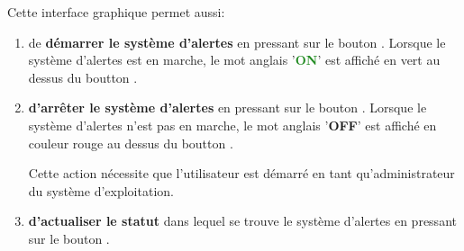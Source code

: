 Cette interface graphique permet aussi:
\begin{enumerate}[1)]
	\item de \textbf{d\'emarrer le syst\`eme d'alertes} en pressant
		sur le bouton . Lorsque le syst\`eme
		d'alertes est en marche, le mot anglais
		'\textbf{\textcolor{forestgreen}{ON}}' est
		affich\'e en vert au dessus du boutton .
		
	\item \textbf{d'arr\^eter le syst\`eme d'alertes} en pressant
		sur le bouton . Lorsque le syst\`eme
		d'alertes n'est pas en marche, le mot anglais
		'\textbf{\textcolor{firebrickred}{OFF}}' est
		affich\'e en couleur rouge au dessus du boutton .
		
		Cette action n\'ecessite que l'utilisateur est d\'emarr\'e
		\yeren en tant qu'administrateur du syst\`eme d'exploitation.
		
	\item \textbf{d'actualiser le statut} dans lequel se trouve
		le syst\`eme d'alertes en pressant sur le bouton
		.		
\end{enumerate}

\newpage

\newpage



\newpage



\newpage



\newpage



\newpage




